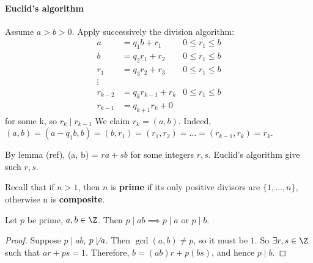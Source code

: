 \documentclass{article}
\begin{document}
\paragraph{Euclid's algorithm} Assume $a > b > 0$. Apply successively the division algorithm:
\begin{align*}
    a &= q_1 b + r_1 & 0 \leq r_1 \le b\\
    b &= q_2 r_1 + r_2 & 0 \leq r_1 \le b\\
    r_1 &= q_3 r_2 + r_3 & 0 \leq r_1 \le b\\
    \vdots \\
    r_{k-2} &= q_k r_{k-1} + r_k & 0 \leq r_1 \le b\\
    r_{k-1} &= q_{k+1} r_k + 0
\end{align*}
for some k, so $r_k \mid r_{k-1}$
We claim $r_k = (a, b)$. Indeed, $(a, b) = (a - q_1 b, b) = (b, r_1) = (r_1, r_2) = \dots = (r_{k-1}, r_k) = r_k$.
\begin{remark}
    By lemma (ref), (a, b) = $r a + s b$ for some integers $r, s$. Euclid's algorithm give such $r, s$.
\end{remark}
Recall that if $n > 1$, then $n$ is \textbf{prime} if its only positive divisors are $\{1, \dots, n\}$, otherwise n is \textbf{composite}.
\begin{nlemma}
    Let $p$ be prime, $a, b \in \Z$.  Then $p \mid ab \implies p \mid a$ or $p \mid b$.
\end{nlemma}
\begin{proof}
    Suppose $p \mid ab$, $p \not \mid a$. Then $\gcd(a, b) \ne p$, so it must be $1$. So $\exists r, s \in \Z$ such that $ar + ps = 1$.
    Therefore, $b = (ab) r + p(bs)$, and hence $p \mid b$.
\end{proof}
\end{document}
